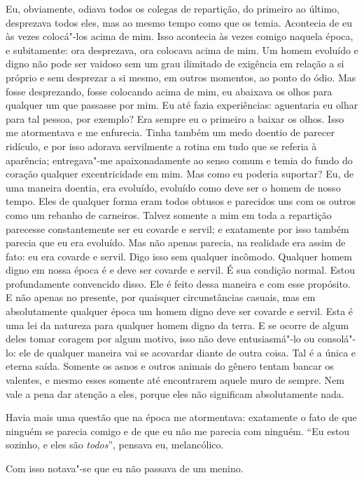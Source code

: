 Eu, obviamente, odiava todos os colegas de repartição, do primeiro ao
último, desprezava todos eles, mas ao mesmo tempo como que os temia.
Acontecia de eu às vezes colocá"-los acima de mim. Isso acontecia às
vezes comigo naquela época, e subitamente: ora desprezava, ora colocava
acima de mim. Um homem evoluído e digno não pode ser vaidoso sem um
grau ilimitado de exigência em relação a si próprio e sem desprezar a
si mesmo, em outros momentos, ao ponto do ódio. Mas fosse desprezando,
fosse colocando acima de mim, eu abaixava os olhos para qualquer um que
passasse por mim. Eu até fazia experiências: aguentaria eu olhar para
tal pessoa, por exemplo? Era sempre eu o primeiro a baixar os olhos.
Isso me atormentava e me enfurecia. Tinha também um medo doentio de
parecer ridículo, e por isso adorava servilmente a rotina em tudo que
se referia à aparência; entregava"-me apaixonadamente ao senso comum e
temia do fundo do coração qualquer excentricidade em mim. Mas como eu
poderia suportar? Eu, de uma maneira doentia, era evoluído, evoluído
como deve ser o homem de nosso tempo. Eles de qualquer forma eram todos
obtusos e parecidos uns com os outros como um rebanho de carneiros.
Talvez somente a mim em toda a repartição parecesse constantemente ser
eu covarde e servil; e exatamente por isso também parecia que eu
era evoluído. Mas não apenas parecia, na realidade era assim de fato:
eu era covarde e servil. Digo isso sem qualquer incômodo. Qualquer
homem digno em nossa época é e deve ser covarde e servil. É sua
condição normal. Estou profundamente convencido disso. Ele é feito
dessa maneira e com esse propósito. E não apenas no presente, por
quaisquer circunstâncias casuais, mas em absolutamente qualquer época
um homem digno deve ser covarde e servil. Esta é uma lei da natureza
para qualquer homem digno da terra. E se ocorre de algum deles tomar
coragem por algum motivo, isso não deve entusiasmá"-lo ou consolá"-lo:
ele de qualquer maneira vai se acovardar diante de outra coisa. Tal é a
única e eterna saída. Somente os asnos e outros animais do gênero
tentam bancar os valentes, e mesmo esses somente até encontrarem aquele
muro de sempre. Nem vale a pena dar atenção a eles, porque eles não
significam absolutamente nada.

Havia mais uma questão que na época me atormentava: exatamente o fato de
que ninguém se parecia comigo e de que eu não me parecia com ninguém.
``Eu estou sozinho, e eles são \textit{todos}'', pensava eu, melancólico.

Com isso notava"-se que eu não passava de um menino.

